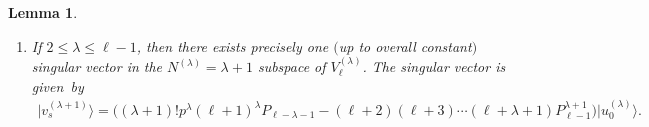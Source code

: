 \documentclass[11pt]{article}
\numberwithin{equation}{section}
\newtheorem{lemma}{Lemma}
\begin{document}
\begin{lemma}
\begin{enumerate}
\begin{gather}
\end{gather}
This implies that there exists no singular vectors in the level $ N^{(\lambda)} $ subspaces if $ 1 {\leq} N^{(\lambda)}
{\leq} \lambda$.
\item[$iii)$] If $ 2 \leq \lambda \leq \ell-1$, then there exists precisely one $($up to overall constant$)$ singular vector in the
$ N^{(\lambda)} = \lambda + 1 $ subspace of $ V^{(\lambda)}_{\ell}$.
The singular vector is given~by
\begin{gather}
\big|v_s^{(\lambda{+}1)}\big\rangle  = \big(  (\lambda+1)!  p^{\lambda} (\ell+1)^{\lambda} P_{\ell{-}\lambda{-}1} \!- (\ell+2) (\ell+3)
\cdots (\ell+\lambda+1) P_{\ell{-}1}^{\lambda{+}1}  \big)\! \big|u_0^{(\lambda)}\big\rangle .\!\!\!\!
\label{SVinQuotientSpace}
\end{gather}
\end{enumerate}
\end{lemma}
\end{document}
